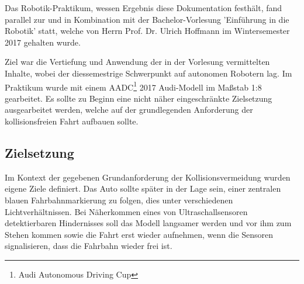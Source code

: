 \documentclass[12pt, a4paper]{scrartcl}
\begin{document}
Das Robotik-Praktikum, wessen Ergebnis diese Dokumentation festhält, fand parallel zur und in Kombination mit der Bachelor-Vorlesung 'Einführung in die Robotik' statt, welche von Herrn Prof. Dr. Ulrich Hoffmann im Wintersemester 2017 gehalten wurde.

Ziel war die Vertiefung und Anwendung der in der Vorlesung vermittelten Inhalte, wobei der diessemestrige Schwerpunkt  auf autonomen Robotern lag. Im Praktikum wurde mit einem AADC\footnote{Audi Autonomous Driving Cup\cite{aadc-website}} 2017 Audi-Modell im Maßstab 1:8 gearbeitet. Es sollte zu Beginn eine nicht näher eingeschränkte Zielsetzung ausgearbeitet werden, welche auf der grundlegenden Anforderung der kollisionsfreien Fahrt aufbauen sollte.

\subsection{Zielsetzung} \label{zielsetzung}

Im Kontext der gegebenen Grundanforderung der Kollisionsvermeidung wurden eigene Ziele definiert. Das Auto sollte später in der Lage sein, einer zentralen blauen Fahrbahnmarkierung zu folgen, dies unter verschiedenen Lichtverhältnissen. Bei Näherkommen eines von Ultraschallsensoren detektierbaren Hindernisses soll das Modell langsamer werden und vor ihm zum Stehen kommen sowie die Fahrt erst wieder aufnehmen, wenn die Sensoren signalisieren, dass die Fahrbahn wieder frei ist.
\end{document}
